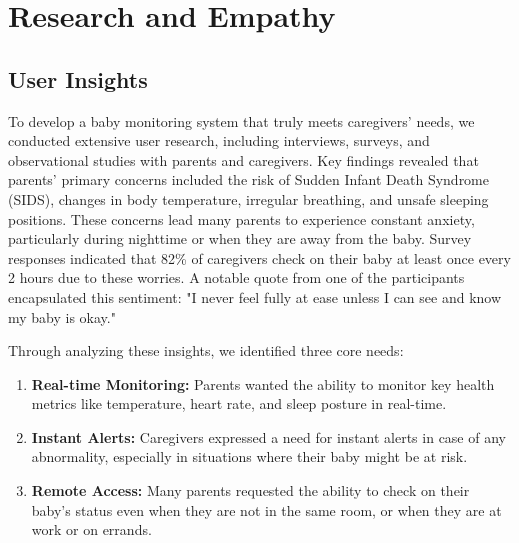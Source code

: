 \documentclass[12pt,a4paper]{report}
\begin{document}
\chapter{Research and Empathy}
\section{User Insights}
To develop a baby monitoring system that truly meets caregivers' needs, we conducted extensive user research, including interviews, surveys, and observational studies with parents and caregivers. Key findings revealed that parents’ primary concerns included the risk of Sudden Infant Death Syndrome (SIDS), changes in body temperature, irregular breathing, and unsafe sleeping positions. These concerns lead many parents to experience constant anxiety, particularly during nighttime or when they are away from the baby. Survey responses indicated that 82\% of caregivers check on their baby at least once every 2 hours due to these worries. A notable quote from one of the participants encapsulated this sentiment: "I never feel fully at ease unless I can see and know my baby is okay."

Through analyzing these insights, we identified three core needs:
\begin{enumerate}
  \item \textbf{Real-time Monitoring:} Parents wanted the ability to monitor key health metrics like temperature, heart rate, and sleep posture in real-time.
  \item \textbf{Instant Alerts:} Caregivers expressed a need for instant alerts in case of any abnormality, especially in situations where their baby might be at risk.
  \item \textbf{Remote Access:} Many parents requested the ability to check on their baby’s status even when they are not in the same room, or when they are at work or on errands.
\end{enumerate}
\end{document}

